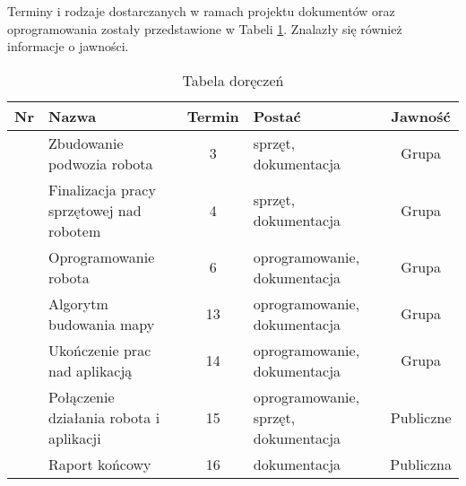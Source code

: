 
Terminy i rodzaje dostarczanych w ramach projektu dokumentów oraz oprogramowania zostały przedstawione w Tabeli \ref{tabela_doreczenie}. Znalazły się również informacje o jawności.


\newcommand\rownumber{\stepcounter{rownumbercounter}\arabic{rownumbercounter}}

\begin{table}[h]
	\centering
	\begin{tabularx}{\linewidth}{|c|X|c|X|c|}
		\hline 
		Nr & Nazwa & Termin & Postać & Jawność \\ \hline
		 \rownumber & Zbudowanie podwozia robota & 3 & sprzęt, dokumentacja & Grupa \\ \hline
		 \rownumber & Finalizacja pracy sprzętowej nad robotem & 4 & sprzęt, dokumentacja & Grupa \\ \hline
		 \rownumber & Oprogramowanie robota & 6 & oprogramowanie, dokumentacja & Grupa \\ \hline
		 \rownumber & Algorytm budowania mapy & 13 & oprogramowanie, dokumentacja & Grupa \\ \hline
		 \rownumber & Ukończenie prac nad aplikacją & 14 & oprogramowanie, dokumentacja & Grupa \\ \hline
		 \rownumber & Połączenie działania robota i aplikacji & 15 & oprogramowanie, sprzęt, dokumentacja & Publiczne \\ \hline
		 \rownumber & Raport końcowy & 16 & dokumentacja & Publiczna \\ \hline
		 
	\end{tabularx}
	\caption{Tabela doręczeń}
	\label{tabela_doreczenie}
\end{table}